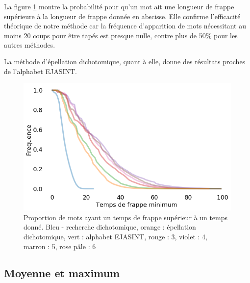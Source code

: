 \documentclass[twoside,twocolumn]{article}
\begin{document}
La figure \ref{frappe-mini} montre la probabilité pour qu'un mot ait une longueur de frappe supérieure à la longueur de frappe donnée en abscisse. Elle confirme l'efficacité théorique de notre méthode car la fréquence d'apparition de mots nécessitant au moins 20 coups pour être tapés est presque nulle, contre plus de 50\% pour les autres méthodes.

La méthode d'épellation dichotomique, quant à elle, donne des résultats proches de l'alphabet EJASINT.


\begin{center}
\begin{figure}
  \includegraphics[scale=0.35]{frappe-mini.png}
  \caption{Proportion de mots ayant un temps de frappe supérieur à un temps donné. Bleu - recherche dichotomique, orange : épellation dichotomique, vert : alphabet EJASINT, rouge : 3, violet : 4, marron : 5, rose pâle : 6}
  \label{frappe-mini}
\end{figure}
\end{center}

\subsection{Moyenne et maximum}
\end{document}
